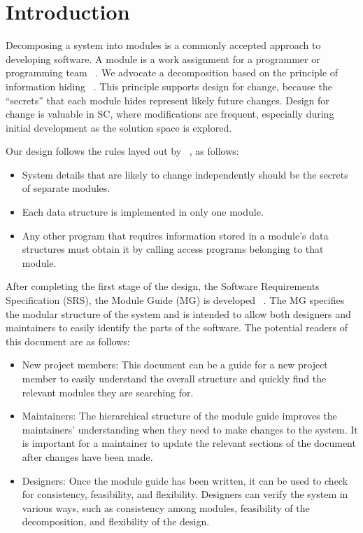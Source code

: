 \documentclass[12pt, titlepage]{article}
\begin{document}
\newpage

\tableofcontents

\listoftables

\listoffigures

\newpage


\section{Introduction}

Decomposing a system into modules is a commonly accepted approach to developing
software.  A module is a work assignment for a programmer or programming
team ~\cite{Parnas1972a}.  We advocate a decomposition
based on the principle of information hiding ~\citep{Parnas1972a}.  This
principle supports design for change, because the ``secrets'' that each module
hides represent likely future changes.  Design for change is valuable in SC,
where modifications are frequent, especially during initial development as the
solution space is explored.  

Our design follows the rules layed out by ~\citet{ParnasEtAl1984}, as follows:
\begin{itemize}
\item System details that are likely to change independently should be the
  secrets of separate modules.
\item Each data structure is implemented in only one module.
\item Any other program that requires information stored in a module's data
  structures must obtain it by calling access programs belonging to that module.
\end{itemize}

After completing the first stage of the design, the Software Requirements
Specification (SRS), the Module Guide (MG) is developed ~\citep{ParnasEtAl1984}. The MG
specifies the modular structure of the system and is intended to allow both
designers and maintainers to easily identify the parts of the software.  The
potential readers of this document are as follows:

\begin{itemize}
\item New project members: This document can be a guide for a new project member
  to easily understand the overall structure and quickly find the
  relevant modules they are searching for.
\item Maintainers: The hierarchical structure of the module guide improves the
  maintainers' understanding when they need to make changes to the system. It is
  important for a maintainer to update the relevant sections of the document
  after changes have been made.
\item Designers: Once the module guide has been written, it can be used to
  check for consistency, feasibility, and flexibility. Designers can verify the
  system in various ways, such as consistency among modules, feasibility of the
  decomposition, and flexibility of the design.
\end{itemize}
\end{document}
